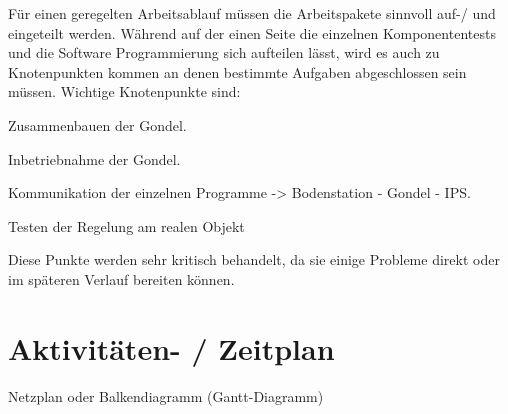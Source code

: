 \documentclass[lang=ngerman,inputenc=utf8,fontsize=10pt]{ldvarticle}
\begin{document}
\begin{itemize}
Für einen geregelten Arbeitsablauf müssen die Arbeitspakete sinnvoll auf-/ und eingeteilt werden.
Während auf der einen Seite die einzelnen Komponententests und die Software Programmierung sich aufteilen lässt, wird es auch zu Knotenpunkten kommen an denen bestimmte Aufgaben abgeschlossen sein müssen. Wichtige Knotenpunkte sind:
\begin{list}{-}{}

\item Zusammenbauen der Gondel.
\item Inbetriebnahme der Gondel.
\item Kommunikation der einzelnen Programme -> Bodenstation - Gondel - IPS.
\item Testen der Regelung am realen Objekt
\end{list}

Diese Punkte werden sehr kritisch behandelt, da sie einige Probleme direkt oder im späteren Verlauf bereiten können.

\section{Aktivitäten- / Zeitplan}

Netzplan oder Balkendiagramm (Gantt-Diagramm)


\end{itemize}
\end{document}
